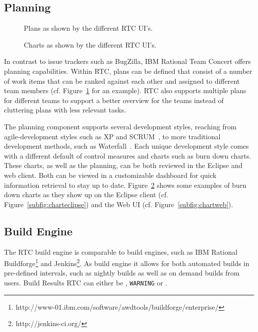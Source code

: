 \subsection{Planning}
\begin{figure}[t]
\centering
{}
\caption{Plans as shown by the different RTC UI's.}
\label{fig:plan}
\end{figure}
\begin{figure}[t]
\centering
{}
\caption{Charts as shown by the different RTC UI's.}
\label{fig:charts}
\end{figure}
In contrast to issue trackers such as BugZilla, IBM Rational Team Concert offers planning capabilities.
Within RTC, plans can be defined that consist of a number of work items that can be ranked against each other and assigned to different team members (cf.  Figure~\ref{fig:plan} for an example).
RTC also supports multiple plans for different teams to support a better overview for the teams instead of cluttering plans with less relevant tasks.

The planning component supports several development styles, reaching from agile-development styles such as XP and SCRUM~\cite{larman:ieeecomputer:2003}, to more traditional development methods, such as Waterfall~\cite{boehm:senotes:1986}.
Each unique development style comes with a different default of control measures and charts such as burn down charts.
These charts, as well as the planning, can be both reviewed in the Eclipse and web client.
Both can be viewed in a customizable dashboard for quick information retrieval to stay up to date.
Figure~\ref{fig:charts} shows some examples of burn down charts as they show up on the Eclipse client (cf. Figure~\ref{subfig:charteclipse}) and the Web UI (cf. Figure~\ref{subfig:chartweb}).

\subsection{Build Engine}
The RTC build engine is comparable to build engines, such as IBM Rational Buildforge\footnote{http://www-01.ibm.com/software/awdtools/buildforge/enterprise/} and Jenkins\footnote{http://jenkins-ci.org/}.
As build engine it allows for both automated builds in pre-defined intervals, such as nightly builds as well as on demand builds from users.
Build Results RTC can either be \error, \texttt{WARNING} or \ok. 

